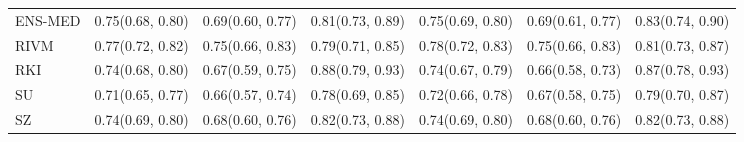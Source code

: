 \begin{tabular}{l p{} p{} p{} p{} p{} p{}}
ENS-MED & {0.75\newline(0.68, 0.80)} & {0.69\newline(0.60, 0.77)} & {0.81\newline(0.73, 0.89)} & {0.75\newline(0.69, 0.80)} & {0.69\newline(0.61, 0.77)} & {0.83\newline(0.74, 0.90)} \\
RIVM & {0.77\newline(0.72, 0.82)} & {0.75\newline(0.66, 0.83)} & {0.79\newline(0.71, 0.85)} & {0.78\newline(0.72, 0.83)} & {0.75\newline(0.66, 0.83)} & {0.81\newline(0.73, 0.87)} \\
RKI & {0.74\newline(0.68, 0.80)} & {0.67\newline(0.59, 0.75)} & {0.88\newline(0.79, 0.93)} & {0.74\newline(0.67, 0.79)} & {0.66\newline(0.58, 0.73)} & {0.87\newline(0.78, 0.93)} \\
SU & {0.71\newline(0.65, 0.77)} & {0.66\newline(0.57, 0.74)} & {0.78\newline(0.69, 0.85)} & {0.72\newline(0.66, 0.78)} & {0.67\newline(0.58, 0.75)} & {0.79\newline(0.70, 0.87)} \\
SZ & {0.74\newline(0.69, 0.80)} & {0.68\newline(0.60, 0.76)} & {0.82\newline(0.73, 0.88)} & {0.74\newline(0.69, 0.80)} & {0.68\newline(0.60, 0.76)} & {0.82\newline(0.73, 0.88)} \\
\bottomrule
\end{tabular}
